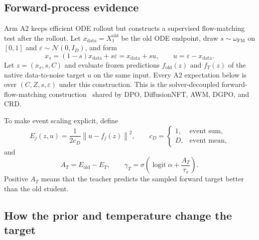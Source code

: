 \documentclass[11pt,a4paper]{article}
\newcommand{\N}{\mathcal{N}}
\newcommand{\norm}[1]{\left\lVert #1 \right\rVert}
\DeclareMathOperator{\logit}{logit}
\theoremstyle{plain}
\theoremstyle{definition}
\begin{document}
\subsection{Forward-process evidence}

Arm A2 keeps efficient ODE rollout but constructs a supervised flow-matching test after the
rollout.  Let $x_{\mathrm{data}}=X_1^{\mathrm{old}}$ be the old ODE endpoint, draw
$s\sim\omega_{\mathrm{FM}}$ on $[0,1]$ and
$\varepsilon\sim\N(0,I_D)$, and form
\begin{equation}
x_s=(1-s)x_{\mathrm{data}}+s\varepsilon
    =x_{\mathrm{data}}+s u,
\qquad
u=\varepsilon-x_{\mathrm{data}}.
\label{eq:a2-forward-path}
\end{equation}
Let $z=(x_s,s,C)$ and evaluate frozen predictions
$f_{\mathrm{old}}(z)$ and $f_T(z)$ of the native data-to-noise target $u$ on the same input.
Every A2 expectation below is over $(C,Z,s,\varepsilon)$ under this construction.  This is the
solver-decoupled forward-flow-matching construction~\cite{flowmatching} shared by DPO,
DiffusionNFT, AWM, DGPO, and CRD.

To make event scaling explicit, define
\begin{equation}
E_j(z,u)
=
\frac{1}{2c_D}\norm{u-f_j(z)}^2,
\qquad
c_D=
\begin{cases}
1, & \text{event sum},\\
D, & \text{event mean},
\end{cases}
\label{eq:a2-energy}
\end{equation}
and
\begin{equation}
A_T=E_{\mathrm{old}}-E_T,
\qquad
\gamma_T
=
\sigma\!\left(
  \logit\alpha+\frac{A_T}{\tau_s}
\right).
\label{eq:a2-gate}
\end{equation}
Positive $A_T$ means that the teacher predicts the sampled forward target better than the old
student.

\subsection{How the prior and temperature change the target}
\end{document}
